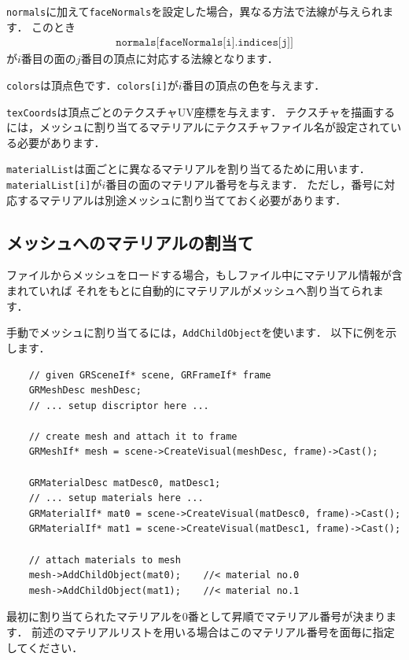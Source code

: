 \texttt{normals}\KLUDGE に加えて\texttt{faceNormals}\KLUDGE を設定した場合，異なる方法で法線が与えられます．
\KLUDGE このとき
\begin{align*}
\texttt{normals[faceNormals[i].indices[j]]}
\end{align*}
\KLUDGE が$i$\KLUDGE 番目の面の$j$\KLUDGE 番目の頂点に対応する法線となります．

\texttt{colors}\KLUDGE は頂点色です．\texttt{colors[i]}\KLUDGE が$i$\KLUDGE 番目の頂点の色を与えます．

\texttt{texCoords}\KLUDGE は頂点ごとのテクスチャUV\KLUDGE 座標を与えます．
\KLUDGE テクスチャを描画するには，メッシュに割り当てるマテリアルにテクスチャファイル名が設定されている必要があります．

\texttt{materialList}\KLUDGE は面ごとに異なるマテリアルを割り当てるために用います．
\texttt{materialList[i]}\KLUDGE が$i$\KLUDGE 番目の面のマテリアル番号を与えます．
\KLUDGE ただし，番号に対応するマテリアルは別途メッシュに割り当てておく必要があります．

\subsection*{\KLUDGE メッシュへのマテリアルの割当て}

\KLUDGE ファイルからメッシュをロードする場合，もしファイル中にマテリアル情報が含まれていれば
\KLUDGE それをもとに自動的にマテリアルがメッシュへ割り当てられます．

\KLUDGE 手動でメッシュに割り当てるには，\texttt{AddChildObject}\KLUDGE を使います．
\KLUDGE 以下に例を示します．
\begin{verbatim}
    // given GRSceneIf* scene, GRFrameIf* frame
    GRMeshDesc meshDesc;
    // ... setup discriptor here ...

    // create mesh and attach it to frame
    GRMeshIf* mesh = scene->CreateVisual(meshDesc, frame)->Cast();

    GRMaterialDesc matDesc0, matDesc1;
    // ... setup materials here ...
    GRMaterialIf* mat0 = scene->CreateVisual(matDesc0, frame)->Cast();
    GRMaterialIf* mat1 = scene->CreateVisual(matDesc1, frame)->Cast();

    // attach materials to mesh
    mesh->AddChildObject(mat0);    //< material no.0
    mesh->AddChildObject(mat1);    //< material no.1
\end{verbatim}
\KLUDGE 最初に割り当てられたマテリアルを0\KLUDGE 番として昇順でマテリアル番号が決まります．
\KLUDGE 前述のマテリアルリストを用いる場合はこのマテリアル番号を面毎に指定してください．


